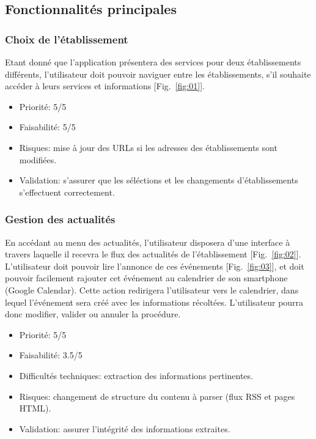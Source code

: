 \documentclass [pdftex,12pt] {report}
\begin{document}
\subsection{Fonctionnalités principales}
\subsubsection{Choix de l'établissement}
Etant donné que l'application présentera des services pour deux établissements différents, l'utilisateur doit pouvoir naviguer entre les établissements, s'il souhaite accéder à leurs services et informations [Fig.~\ref{fig:01}]. \\

\begin{itemize}
\renewcommand{\labelitemi}{$\bullet$}
\item Priorité: 5/5
\item Faisabilité: 5/5
\item Risques: mise à jour des URLs si les adresses des établissements sont modifiées.
\item Validation: s'assurer que les séléctions et les changements d'établissements s'effectuent correctement.
\end{itemize}

\subsubsection{Gestion des actualités}
En accédant au menu des actualités, l'utilisateur disposera d'une interface à travers laquelle il recevra le flux des actualités de l'établissement [Fig.~\ref{fig:02}]. L'utilisateur doit pouvoir lire l'annonce de ces événements [Fig.~\ref{fig:03}], et doit pouvoir facilement rajouter cet événement au calendrier de son smartphone (Google Calendar). Cette action redirigera l'utilisateur vers le calendrier, dans lequel l'événement sera créé avec les informations récoltées. L'utilisateur pourra donc modifier, valider ou annuler la procédure.

\begin{itemize}
\renewcommand{\labelitemi}{$\bullet$}
\item Priorité: 5/5
\item Faisabilité: 3.5/5
\item Difficultés techniques: extraction des informations pertinentes.
\item Risques: changement de structure du contenu à parser (flux RSS et pages HTML).
\item Validation: assurer l'intégrité des informations extraites.
\end{itemize}
\end{document}
